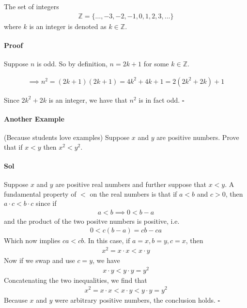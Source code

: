 \documentclass[../main.tex]{subfiles}
\begin{document}
The set of integers
\begin{align*}
    \mathbb{Z} = \{ \dots, -3, -2, -1, 0, 1, 2, 3, \dots \}
\end{align*}
where $k$ is an integer is denoted as $k \in \mathbb{Z}$.

\paragraph{Proof}

Suppose $n$ is odd. So by definition, $n = 2k + 1$ for some $k \in \mathbb{Z}$.

\begin{align*}
    \implies n^2 = (2k + 1) (2k + 1) = 4k^2 + 4k + 1 = 2(2k^2 + 2k) + 1
\end{align*}

Since $2k^2 + 2k$ is an integer, we have that $n^2$ is in fact odd. $\square$

\paragraph{Another Example} (Because students love examples)
Suppose $x$ and $y$ are positive numbers. Prove that if $x < y$ then $x^2 < y^2$.

\paragraph{Sol}

Suppose $x$ and $y$ are positive real numbers and further suppose that $x < y$. A fundamental
property of $<$ on the real numbers is that if $a < b$ and $c > 0$, then $a \cdot c < b \cdot c$
since if 
\begin{align*}
    a < b \implies 0 < b - a
\end{align*}
and the product of the two positve numbers is positive, i.e.
\begin{align*}
    0 < c(b - a) = c b - c a
\end{align*}
Which now implies $ca < cb$. In this case, if $a = x, b = y, c = x$, then
\begin{align*}
    x^2 = x \cdot x < x \cdot y
\end{align*}
Now if we swap and use $c = y$, we have
\begin{align*}
    x \cdot y < y \cdot y = y^2
\end{align*}
Concatenating the two inequalities, we find that
\begin{align*}
    x^2 = x \cdot x < x \cdot y < y \cdot y = y^2
\end{align*}
Because $x$ and $y$ were arbitrary positive numbers, the conclusion holds. $\square$
\end{document}
